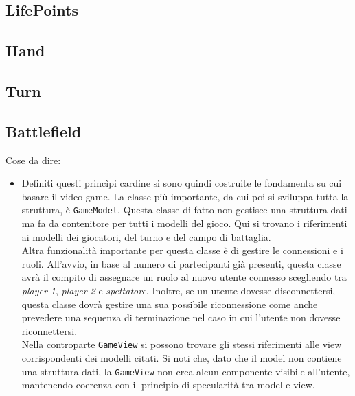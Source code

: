 \subsection{LifePoints}\label{subsec:lifepoints}
\subsection{Hand}\label{subsec:hand}
\subsection{Turn}\label{subsec:turn}
\subsection{Battlefield}\label{subsec:battlefield}

Cose da dire:
\begin{itemize}
\item Definiti questi princìpi cardine si sono quindi costruite le fondamenta su cui basare il video game. La classe più importante, da cui poi si sviluppa tutta la struttura, è 
\texttt{GameModel}. Questa classe di fatto non gestisce una struttura dati ma fa da contenitore per tutti i modelli del gioco. Qui si trovano i riferimenti ai modelli dei giocatori,
del turno e del campo di battaglia.\\
Altra funzionalità importante per questa classe è di gestire le connessioni e i ruoli. All'avvio, in base al numero di partecipanti già presenti, questa classe avrà il compito di 
assegnare un ruolo al nuovo utente connesso scegliendo tra \textit{player 1}, \textit{player 2} e \textit{spettatore}. Inoltre, se un utente dovesse disconnettersi, questa classe
dovrà gestire una sua possibile riconnessione come anche prevedere una sequenza di terminazione nel caso in cui l'utente non dovesse riconnettersi.\\
Nella controparte \texttt{GameView} si possono trovare gli stessi riferimenti alle view corrispondenti dei modelli citati. Si noti che, dato che il model non contiene una struttura
dati, la \texttt{GameView} non crea alcun componente visibile all'utente, mantenendo coerenza con il principio di specularità tra model e view.\\
\end{itemize}